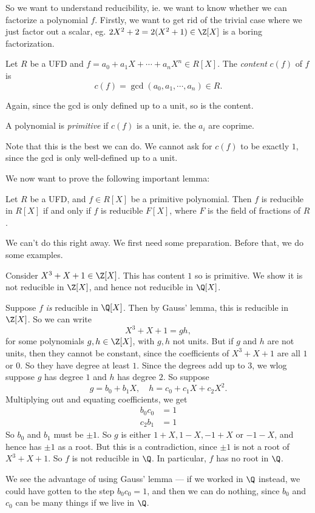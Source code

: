 \documentclass[a4paper]{article}
\begin{document}
So we want to understand reducibility, ie. we want to know whether we can factorize a polynomial $f$. Firstly, we want to get rid of the trivial case where we just factor out a scalar, eg. $2X^2 + 2 = 2(X^2 + 1) \in \Z[X]$ is a boring factorization.

\begin{defi}[Content]
  Let $R$ be a UFD and $f = a_0 + a_1 X + \cdots + a_n X^n \in R[X]$. The \emph{content} $c(f)$ of $f$ is
  \[
    c(f) = \gcd(a_0, a_1, \cdots, a_n) \in R.
  \]
\end{defi}
Again, since the gcd is only defined up to a unit, so is the content.

\begin{defi}
  A polynomial is \emph{primitive} if $c(f)$ is a unit, ie. the $a_i$ are coprime.
\end{defi}
Note that this is the best we can do. We cannot ask for $c(f)$ to be exactly $1$, since the gcd is only well-defined up to a unit.

We now want to prove the following important lemma:
\begin{lemma}
  Let $R$ be a UFD, and $f \in R[X]$ be a primitive polynomial. Then $f$ is reducible in $R[X]$ if and only if $f$ is reducible $F[X]$, where $F$ is the field of fractions of $R$.
\end{lemma}

We can't do this right away. We first need some preparation. Before that, we do some examples.
\begin{eg}
  Consider $X^3 + X + 1 \in \Z[X]$. This has content $1$ so is primitive. We show it is not reducible in $\Z[X]$, and hence not reducible in $\Q[X]$.

  Suppose $f$ \emph{is} reducible in $\Q[X]$. Then by Gauss' lemma, this is reducible in $\Z[X]$. So we can write
  \[
    X^3 + X + 1 = gh,
  \]
  for some polynomials $g, h \in \Z[X]$, with $g, h$ not units. But if $g$ and $h$ are not units, then they cannot be constant, since the coefficients of $X^3 + X + 1$ are all $1$ or $0$. So they have degree at least $1$. Since the degrees add up to $3$, we wlog suppose $g$ has degree $1$ and $h$ has degree $2$. So suppose
  \[
    g = b_0 + b_1X,\quad h = c_0 + c_1 X + c_2 X^2.
  \]
  Multiplying out and equating coefficients, we get
  \begin{align*}
    b_0 c_0 &= 1\\
    c_2 b_1 &= 1
  \end{align*}
  So $b_0$ and $b_1$ must be $\pm 1$. So $g$ is either $1 + X, 1 - X, -1 + X$ or $-1 - X$, and hence has $\pm 1$ as a root. But this is a contradiction, since $\pm 1$ is not a root of $X^3 + X + 1$. So $f$ is not reducible in $\Q$. In particular, $f$ has no root in $\Q$.
\end{eg}
We see the advantage of using Gauss' lemma --- if we worked in $\Q$ instead, we could have gotten to the step $b_0 c_0 = 1$, and then we can do nothing, since $b_0$ and $c_0$ can be many things if we live in $\Q$.
\end{document}
